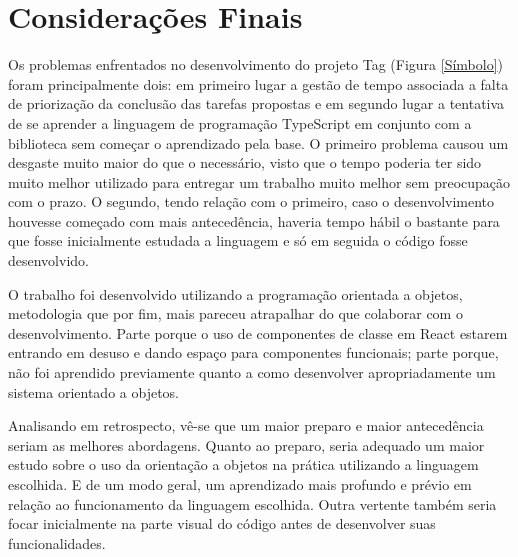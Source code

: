 
\chapter{Considerações Finais}

Os problemas enfrentados no desenvolvimento do projeto Tag (Figura \ref{Símbolo}) foram principalmente dois: em primeiro lugar a gestão de tempo associada a falta de priorização da conclusão das tarefas propostas e em segundo lugar a tentativa de se aprender a linguagem de programação TypeScript em conjunto com a biblioteca  sem começar o aprendizado pela base. O primeiro problema causou um desgaste muito maior do que o necessário, visto que o tempo poderia ter sido muito melhor utilizado para entregar um trabalho muito melhor sem preocupação com o prazo. O segundo, tendo relação com o primeiro, caso o desenvolvimento houvesse começado com mais antecedência, haveria tempo hábil o bastante para que fosse inicialmente estudada a linguagem e só em seguida o código fosse desenvolvido.

O trabalho foi desenvolvido utilizando a programação orientada a objetos, metodologia que por fim, mais pareceu atrapalhar do que colaborar com o desenvolvimento. Parte porque o uso de componentes de classe em React estarem entrando em desuso e dando espaço para componentes funcionais; parte porque, não foi aprendido previamente quanto a como desenvolver apropriadamente um sistema orientado a objetos.

Analisando em retrospecto, vê-se que um maior preparo e maior antecedência seriam as melhores abordagens. Quanto ao preparo, seria adequado um maior estudo sobre o uso da orientação a objetos na prática utilizando a linguagem escolhida. E de um modo geral, um aprendizado mais profundo e prévio em relação ao funcionamento da linguagem escolhida. Outra vertente também seria focar inicialmente na parte visual do código antes de desenvolver suas funcionalidades.


